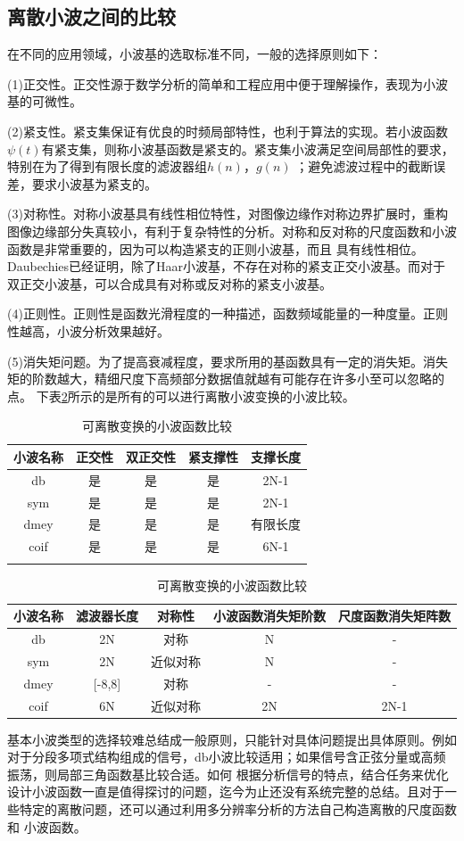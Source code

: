 \subsection{离散小波之间的比较}
在不同的应用领域，小波基的选取标准不同，一般的选择原则如下：
\par (1)正交性。正交性源于数学分析的简单和工程应用中便于理解操作，表现为小波基的可微性。
\par (2)紧支性。紧支集保证有优良的时频局部特性，也利于算法的实现。若小波函数$\psi(t)$有紧支集，则称小波基函数是紧支的。紧支集小波满足空间局部性的要求，特别在为了得到有限长度的滤波器组$h(n)$，$g(n)$
；避免滤波过程中的截断误差，要求小波基为紧支的。
\par (3)对称性。对称小波基具有线性相位特性，对图像边缘作对称边界扩展时，重构图像边缘部分失真较小，有利于复杂特性的分析。对称和反对称的尺度函数和小波函数是非常重要的，因为可以构造紧支的正则小波基，而且
具有线性相位。Daubechies已经证明，除了Haar小波基，不存在对称的紧支正交小波基。而对于双正交小波基，可以合成具有对称或反对称的紧支小波基。
\par (4)正则性。正则性是函数光滑程度的一种描述，函数频域能量的一种度量。正则性越高，小波分析效果越好。
\par (5)消失矩问题。为了提高衰减程度，要求所用的基函数具有一定的消失矩。消失矩的阶数越大，精细尺度下高频部分数据值就越有可能存在许多小至可以忽略的点。
下表\ref{tab:lsxb}所示的是所有的可以进行离散小波变换的小波比较\cite{wxf2003}。
\begin{table}[!h]
	\centering
	\caption{可离散变换的小波函数比较}
	\label{tab:lsxb}
	\begin{tabular}{c|c|c|c|c}
	\hline
	小波名称&正交性&双正交性&紧支撑性&支撑长度\\
	\hline
	db&是&是&是&2N-1\\
	sym&是&是&是&2N-1\\
	dmey&是&是&是&有限长度\\
	coif&是&是&是&6N-1\\
	\hline
	\multicolumn{5}{c}{}
	\end{tabular}
	\begin{tabular}{c|c|c|c|c}
	\hline
	小波名称&滤波器长度&对称性&小波函数消失矩阶数&尺度函数消失矩阵数\\
	\hline
	db&2N&对称&N&-\\
	sym&2N&近似对称&N&-\\
	dmey&[-8,8]&对称&-&-\\
	coif&6N&近似对称&2N&2N-1\\
	\hline
	\end{tabular}
\end{table}
基本小波类型的选择较难总结成一般原则，只能针对具体问题提出具体原则。例如对于分段多项式结构组成的信号，db小波比较适用；如果信号含正弦分量或高频振荡，则局部三角函数基比较合适。如何
根据分析信号的特点，结合任务来优化设计小波函数一直是值得探讨的问题，迄今为止还没有系统完整的总结。且对于一些特定的离散问题，还可以通过利用多分辨率分析的方法自己构造离散的尺度函数和
小波函数。
